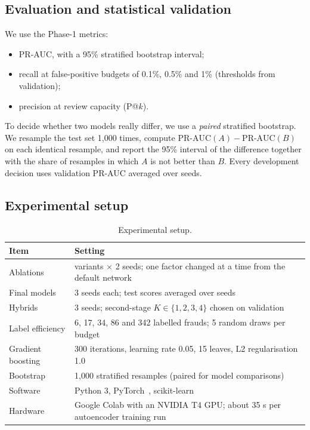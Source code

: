 \documentclass[12pt]{article}
\begin{document}
\subsection{Evaluation and statistical validation}
We use the Phase-1 metrics:
\begin{itemize}
\item PR-AUC, with a 95\% stratified bootstrap interval;
\item recall at false-positive budgets of 0.1\%, 0.5\% and 1\% (thresholds from validation);
\item precision at review capacity (P@$k$).
\end{itemize}
To decide whether two models really differ, we use a \emph{paired} stratified bootstrap. We resample the test set
1{,}000 times, compute $\text{PR-AUC}(A)-\text{PR-AUC}(B)$ on each identical resample, and report the 95\% interval of the
difference together with the share of resamples in which $A$ is not better than $B$. Every development decision uses
validation PR-AUC averaged over seeds.

\subsection{Experimental setup}
\begin{table}[H]
\centering\small
\caption{Experimental setup.}
\label{tab:setup}
\begin{tabularx}{\linewidth}{@{}l X@{}}
\toprule
\textbf{Item} & \textbf{Setting}\\
\midrule
Ablations & \nAblations{} variants $\times$ 2 seeds; one factor changed at a time from the default network\\
Final models & 3 seeds each; test scores averaged over seeds\\
Hybrids & 3 seeds; second-stage $K\in\{1,2,3,4\}$ chosen on validation\\
Label efficiency & 6, 17, 34, 86 and 342 labelled frauds; 5 random draws per budget\\
Gradient boosting & 300 iterations, learning rate 0.05, 15 leaves, L2 regularisation 1.0\\
Bootstrap & 1{,}000 stratified resamples (paired for model comparisons)\\
Software & Python 3, PyTorch~\cite{paszke2019}, scikit-learn~\cite{pedregosa2011}\\
Hardware & Google Colab with an NVIDIA T4 GPU; about 35 s per autoencoder training run\\
\bottomrule
\end{tabularx}
\end{table}
\end{document}
